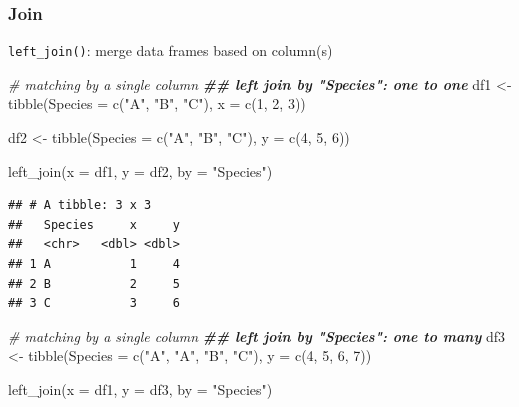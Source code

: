 \documentclass[
]{article}
\newenvironment{Shaded}{\begin{snugshade}}{\end{snugshade}}
\newcommand{\AttributeTok}[1]{\textcolor[rgb]{0.77,0.63,0.00}{#1}}
\newcommand{\CommentTok}[1]{\textcolor[rgb]{0.56,0.35,0.01}{\textit{#1}}}
\newcommand{\DecValTok}[1]{\textcolor[rgb]{0.00,0.00,0.81}{#1}}
\newcommand{\DocumentationTok}[1]{\textcolor[rgb]{0.56,0.35,0.01}{\textbf{\textit{#1}}}}
\newcommand{\FunctionTok}[1]{\textcolor[rgb]{0.00,0.00,0.00}{#1}}
\newcommand{\NormalTok}[1]{#1}
\newcommand{\OtherTok}[1]{\textcolor[rgb]{0.56,0.35,0.01}{#1}}
\newcommand{\StringTok}[1]{\textcolor[rgb]{0.31,0.60,0.02}{#1}}
\begin{document}
\hypertarget{join}{%
\subsubsection{Join}\label{join}}

\texttt{left\_join()}: merge data frames based on column(s)

\begin{Shaded}
\begin{Highlighting}[]
\CommentTok{\# matching by a single column}
\DocumentationTok{\#\# left join by "Species": one to one}
\NormalTok{df1 }\OtherTok{\textless{}{-}} \FunctionTok{tibble}\NormalTok{(}\AttributeTok{Species =} \FunctionTok{c}\NormalTok{(}\StringTok{"A"}\NormalTok{, }\StringTok{"B"}\NormalTok{, }\StringTok{"C"}\NormalTok{),}
              \AttributeTok{x =} \FunctionTok{c}\NormalTok{(}\DecValTok{1}\NormalTok{, }\DecValTok{2}\NormalTok{, }\DecValTok{3}\NormalTok{))}

\NormalTok{df2 }\OtherTok{\textless{}{-}} \FunctionTok{tibble}\NormalTok{(}\AttributeTok{Species =} \FunctionTok{c}\NormalTok{(}\StringTok{"A"}\NormalTok{, }\StringTok{"B"}\NormalTok{, }\StringTok{"C"}\NormalTok{),}
              \AttributeTok{y =} \FunctionTok{c}\NormalTok{(}\DecValTok{4}\NormalTok{, }\DecValTok{5}\NormalTok{, }\DecValTok{6}\NormalTok{))}

\FunctionTok{left\_join}\NormalTok{(}\AttributeTok{x =}\NormalTok{ df1,}
          \AttributeTok{y =}\NormalTok{ df2,}
          \AttributeTok{by =} \StringTok{"Species"}\NormalTok{)}
\end{Highlighting}
\end{Shaded}

\begin{verbatim}
## # A tibble: 3 x 3
##   Species     x     y
##   <chr>   <dbl> <dbl>
## 1 A           1     4
## 2 B           2     5
## 3 C           3     6
\end{verbatim}

\begin{Shaded}
\begin{Highlighting}[]
\CommentTok{\# matching by a single column}
\DocumentationTok{\#\# left join by "Species": one to many}
\NormalTok{df3 }\OtherTok{\textless{}{-}} \FunctionTok{tibble}\NormalTok{(}\AttributeTok{Species =} \FunctionTok{c}\NormalTok{(}\StringTok{"A"}\NormalTok{, }\StringTok{"A"}\NormalTok{, }\StringTok{"B"}\NormalTok{, }\StringTok{"C"}\NormalTok{),}
              \AttributeTok{y =} \FunctionTok{c}\NormalTok{(}\DecValTok{4}\NormalTok{, }\DecValTok{5}\NormalTok{, }\DecValTok{6}\NormalTok{, }\DecValTok{7}\NormalTok{))}

\FunctionTok{left\_join}\NormalTok{(}\AttributeTok{x =}\NormalTok{ df1,}
          \AttributeTok{y =}\NormalTok{ df3,}
          \AttributeTok{by =} \StringTok{"Species"}\NormalTok{)}
\end{Highlighting}
\end{Shaded}
\end{document}
